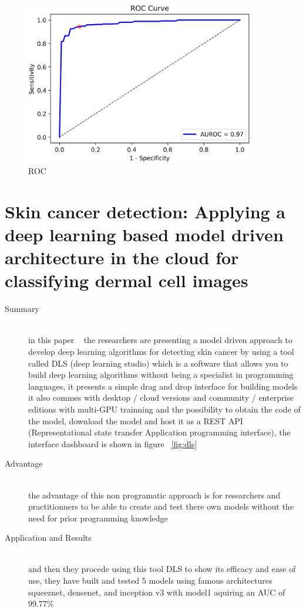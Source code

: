 \begin{figure}[htbp]
\begin{center}
\includegraphics[width=10cm]{./chapter-03-state-of-the-art/ROC.png}
\end{center}
\caption{ROC}
\label{fig:roc}
\end{figure}







\section{Skin cancer detection: Applying a deep learning based model driven architecture in the cloud for classifying dermal cell images}
\begin{description}
\item[Summary] \hfill \\
in this paper ~\cite{Kadampur2020} the researchers are presenting a model driven approach to develop deep learning algorithms for detecting skin cancer by using a tool called DLS (deep learning studio) which is a software that allows you to build deep learning algorithms without being a specialist in programming languages, it presents a simple drag and drop interface for building models it also commes with desktop / cloud versions and community / enterprise editions with multi-GPU trainning and the possibility to obtain the code of the model, download the model and host it as a REST API (Representational state transfer Application programming interface), the interface dashboard is shown in figure ~\ref{fig:dls}
\item[Advantage] \hfill \\
the advantage of this non programatic approach is for researchers and practitionners to be able to create and test there own models without the need for prior programming knowledge
\item[Application and Results] \hfill \\
and then they procede using this tool DLS to show its efficacy and ease of use, they have built and tested 5 models using famous architectures squeeznet, densenet, and inception v3
with model1 aquiring an AUC of 99.77\% 
\end{description}


